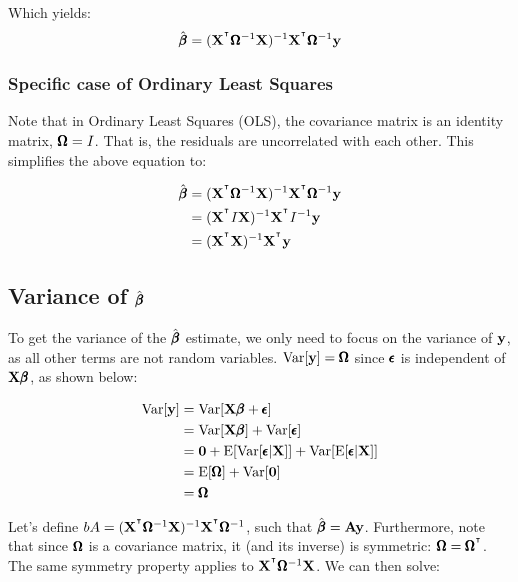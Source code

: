 \documentclass[12pt]{article}
\begin{document}
Which yields:
$$ \hat{\pmb{\beta}} = (\mathbf{X}^{^\intercal} \pmb{\Omega}^{-1} \mathbf{X})^{-1} \mathbf{X}^{^\intercal} \pmb{\Omega}^{-1} \mathbf{y} $$

\subsubsection{Specific case of Ordinary Least Squares}

Note that in Ordinary Least Squares (OLS), the covariance matrix is an identity matrix, $\pmb{\Omega} = I$. That is, the residuals are uncorrelated with each other. This simplifies the above equation to:

\begin{align*}
    \hat{\pmb{\beta}} &= (\mathbf{X}^{^\intercal} \pmb{\Omega}^{-1} \mathbf{X})^{-1} \mathbf{X}^{^\intercal} \pmb{\Omega}^{-1} \mathbf{y} \\
    &= (\mathbf{X}^{^\intercal} I \mathbf{X})^{-1} \mathbf{X}^{^\intercal} I^{-1} \mathbf{y} \\
    &= (\mathbf{X}^{^\intercal} \mathbf{X})^{-1} \mathbf{X}^{^\intercal} \mathbf{y}
\end{align*}



\subsection[Variance of beta-hat]{Variance of $\hat{\pmb{\beta}}$}

To get the variance of the $\hat{\pmb{\beta}}$ estimate, we only need to focus on the variance of $\mathbf{y}$, as all other terms are not random variables. $\mathrm{Var}[\mathbf{y}] = \pmb{\Omega}$ since $\pmb{\epsilon}$ is independent of $\mathbf{X} \pmb{\beta}$, as shown below:

\begin{align*}
    \mathrm{Var}[\mathbf{y}] &= \mathrm{Var}[\mathbf{X} \pmb{\beta} + \pmb{\epsilon}] \\
    &= \mathrm{Var}[\mathbf{X} \pmb{\beta}] + \mathrm{Var}[\pmb{\epsilon}] \\
    &= \mathbf{0} + \mathrm{E}[ \mathrm{Var}[\pmb{\epsilon} | \mathbf{X}] ] + \mathrm{Var}[ \mathrm{E}[\pmb{\epsilon} | \mathbf{X}]] \\
    &= \mathrm{E}[ \pmb{\Omega} ] + \mathrm{Var}[ \mathbf{0} ] \\ 
    &= \pmb{\Omega}
\end{align*}

Let's define $bA = (\mathbf{X}^{^\intercal} \pmb{\Omega}^{-1} \mathbf{X})^{-1} \mathbf{X}^{^\intercal} \pmb{\Omega}^{-1}$, such that $\hat{\pmb{\beta}} = \mathbf{A} \mathbf{y}$. Furthermore, note that since $\pmb{\Omega}$ is a covariance matrix, it (and its inverse) is symmetric: $\pmb{\Omega} = \pmb{\Omega}^{^\intercal}$. The same symmetry property applies to $\mathbf{X}^{^\intercal} \pmb{\Omega}^{-1} \mathbf{X}$. We can then solve:
\end{document}
